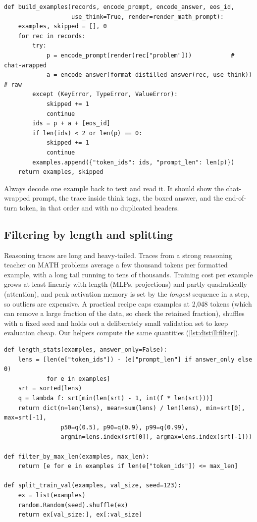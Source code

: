 \begin{lstlisting}[caption={Tokenising the dataset once (\texttt{llmsys/distill.py}).},
label={lst:distill:build}]
def build_examples(records, encode_prompt, encode_answer, eos_id,
                   use_think=True, render=render_math_prompt):
    examples, skipped = [], 0
    for rec in records:
        try:
            p = encode_prompt(render(rec["problem"]))           # chat-wrapped
            a = encode_answer(format_distilled_answer(rec, use_think))  # raw
        except (KeyError, TypeError, ValueError):
            skipped += 1
            continue
        ids = p + a + [eos_id]
        if len(ids) < 2 or len(p) == 0:
            skipped += 1
            continue
        examples.append({"token_ids": ids, "prompt_len": len(p)})
    return examples, skipped
\end{lstlisting}

Always decode one example back to text and read it. It should show the chat-wrapped prompt,
the trace inside think tags, the boxed answer, and the end-of-turn token, in that order and
with no duplicated headers.

\subsection{Filtering by length and splitting}\label{sec:distill:filter}

Reasoning traces are long and heavy-tailed. Traces from a strong reasoning teacher on MATH problems
average a few thousand tokens per formatted example, with a long tail running to tens of
thousands. Training cost per example grows at least linearly with length (MLPs,
projections) and partly quadratically (attention), and peak activation memory is set by the
\emph{longest} sequence in a step, so outliers are expensive. A practical recipe caps examples at
2{,}048 tokens (which can remove a large fraction of the data, so check the retained fraction),
shuffles with a fixed seed and holds out a deliberately small validation set to keep evaluation
cheap. Our helpers compute the same quantities
(\cref{lst:distill:filter}).

\begin{lstlisting}[caption={Length statistics, filtering and splitting.},label={lst:distill:filter}]
def length_stats(examples, answer_only=False):
    lens = [len(e["token_ids"]) - (e["prompt_len"] if answer_only else 0)
            for e in examples]
    srt = sorted(lens)
    q = lambda f: srt[min(len(srt) - 1, int(f * len(srt)))]
    return dict(n=len(lens), mean=sum(lens) / len(lens), min=srt[0], max=srt[-1],
                p50=q(0.5), p90=q(0.9), p99=q(0.99),
                argmin=lens.index(srt[0]), argmax=lens.index(srt[-1]))

def filter_by_max_len(examples, max_len):
    return [e for e in examples if len(e["token_ids"]) <= max_len]

def split_train_val(examples, val_size, seed=123):
    ex = list(examples)
    random.Random(seed).shuffle(ex)
    return ex[val_size:], ex[:val_size]
\end{lstlisting}

